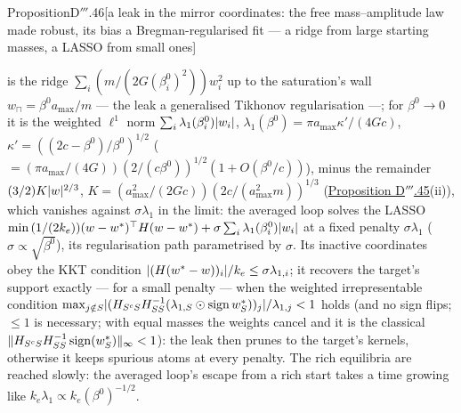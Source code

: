 \begin{thm}{Proposition}{D$'''$.46}[a leak in the mirror coordinates: the free mass--amplitude law made robust, its bias
a Bregman-regularised fit --- a ridge from large starting masses, a LASSO from small
ones]
\begin{enumerate}[label=\textup{(\roman*)}]
    is the ridge $\sum_i(m/(2G(\beta^0_i)^2))w_i^2$ up to the saturation's wall $w_\sqcap = \beta^0a_{\max}/m$ --- the
    leak a generalised Tikhonov regularisation ---; for $\beta^0\to0$ it is the weighted $\ell^1$ norm
    $\sum_i\lambda_1(\beta^0_i)\lvert w_i\rvert$, $\lambda_1(\beta^0) = \pi a_{\max}\kappa'/(4Gc)$,
    $\kappa' = ((2c - \beta^0)/\beta^0)^{1/2}$ ($= (\pi a_{\max}/(4G))(2/(c\beta^0))^{1/2}(1 + O(\beta^0/c))$), minus
    the remainder $(3/2)K\lvert w\rvert^{2/3}$, $K = (a_{\max}^2/(2Gc))(2c/(a_{\max}^2m))^{1/3}$
    (\hyperref[res:thmDppp:45]{Proposition D$'''$.45}(ii)), which vanishes against $\sigma\lambda_1$ in the limit: the
    averaged loop solves the LASSO
    $\min\,(1/(2k_e))\allowbreak(w - w^*)^\top H(w - w^*) + \sigma\sum_i\lambda_1(\beta^0_i)\lvert w_i\rvert$ at a fixed penalty
    $\sigma\lambda_1$ ($\sigma\propto\sqrt{\beta^0}$), its regularisation path parametrised by $\sigma$. Its inactive
    coordinates obey the KKT condition $\lvert (H(w^* - w))_i\rvert/k_e\le\sigma\lambda_{1,i}$; it recovers the target's
    support exactly --- for a small penalty --- when the weighted irrepresentable condition
    $\max_{j\notin S}\lvert (H_{S^cS}H_{SS}^{-1}(\lambda_{1,S}\odot\operatorname{sign}w^*_S))_j\rvert/\lambda_{1,j} < 1$ holds
    (and no sign flips; $\le1$ is necessary; with equal masses the weights cancel and it is the classical
    $\lVert H_{S^cS}H_{SS}^{-1}\operatorname{sign}(w^*_S)\rVert_\infty < 1$): the leak then prunes to the target's kernels,
    otherwise it keeps spurious atoms at every penalty. The rich equilibria are reached slowly: the averaged loop's
    escape from a rich start takes a time growing like $k_e\lambda_1\propto k_e(\beta^0)^{-1/2}$.
\end{enumerate}
\end{thm}

